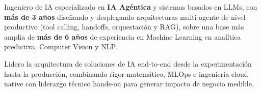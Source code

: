 %
%
%
\par{
Ingeniero de IA especializado en \textbf{IA Agéntica} y sistemas basados en LLMs, con \textbf{más de 3 años} diseñando y desplegando arquitecturas multi-agente de nivel productivo (tool calling, handoffs, orquestación y RAG), sobre una base más amplia de \textbf{más de 6 años} de experiencia en Machine Learning en analítica predictiva, Computer Vision y NLP.
}
\par{
Lidero la arquitectura de soluciones de IA end-to-end desde la experimentación hasta la producción, combinando rigor matemático, MLOps e ingeniería cloud-native con liderazgo técnico hands-on para generar impacto de negocio medible.
}
\vspace{1em}